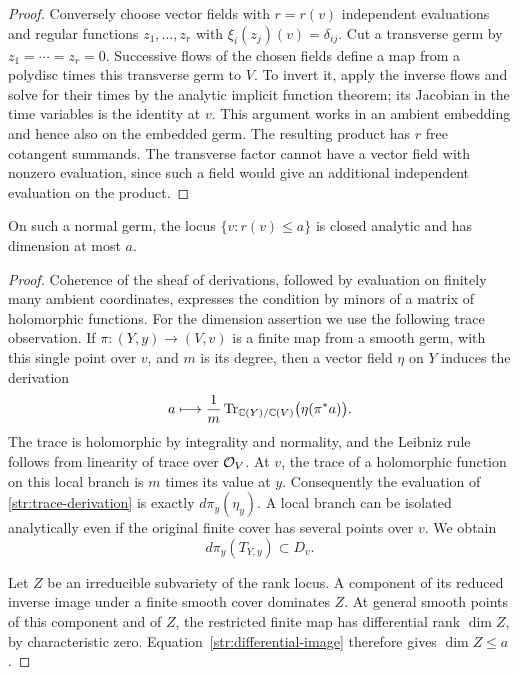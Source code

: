 \begin{proof}
Conversely choose vector fields with $r=r(v)$ independent evaluations and
regular functions $z_1,\ldots,z_r$ with
$\xi_i(z_j)(v)=\delta_{ij}$.  Cut a transverse germ by $z_1=\cdots=z_r=0$.
Successive flows of the chosen fields define a map from a polydisc times
this transverse germ to $V$.  To invert it, apply the inverse flows and
solve for their times by the analytic implicit function theorem; its
Jacobian in the time variables is the identity at $v$.  This argument
works in an ambient embedding and hence also on the embedded germ.
The resulting product has $r$ free cotangent summands.  The transverse
factor cannot have a vector field with nonzero evaluation, since such a
field would give an additional independent evaluation on the product.
\end{proof}

\begin{lemma}\label{str:rank-locus}
On such a normal germ, the locus $\{v:r(v)\leq a\}$ is closed analytic
and has dimension at most $a$.
\end{lemma}

\begin{proof}
Coherence of the sheaf of derivations, followed by evaluation on finitely
many ambient coordinates, expresses the condition by minors of a matrix
of holomorphic functions.  For the dimension assertion we use the
following trace observation.  If $\pi:(Y,y)\to(V,v)$ is a finite map
from a smooth germ, with this single point over $v$, and $m$ is its degree,
then a vector field $\eta$ on $Y$ induces the derivation
\begin{equation}\label{str:trace-derivation}
 a\longmapsto\frac{1}{m}\operatorname{Tr}_{\mathbb C(Y)/\mathbb C(V)}
                    \bigl(\eta(\pi^*a)\bigr).
\end{equation}
The trace is holomorphic by integrality and normality, and the Leibniz
rule follows from linearity of trace over $\mathcal O_V$.  At $v$, the trace of a
holomorphic function on this local branch is $m$ times its value at $y$.
Consequently the evaluation of \eqref{str:trace-derivation} is exactly
$d\pi_y(\eta_y)$.  A local branch can be isolated analytically even if
the original finite cover has several points over $v$.  We obtain
\begin{equation}\label{str:differential-image}
 d\pi_y(T_{Y,y})\subset D_v.
\end{equation}

Let $Z$ be an irreducible subvariety of the rank locus.  A component of
its reduced inverse image under a finite smooth cover dominates $Z$.
At general smooth points of this component and of $Z$, the restricted
finite map has differential rank $\dim Z$, by characteristic zero.
Equation~\eqref{str:differential-image} therefore gives $\dim Z\leq a$.
\end{proof}


